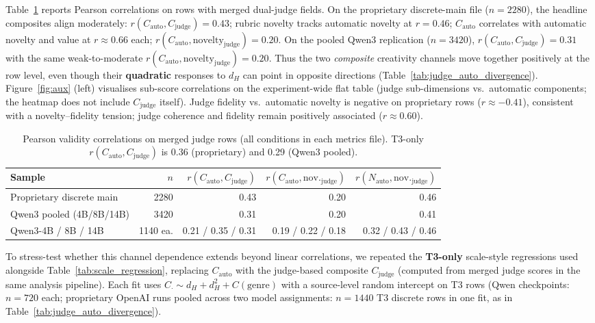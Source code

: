 \documentclass[sigconf,nonacm]{acmart}
\begin{document}
Table~\ref{tab:validity_corr} reports Pearson correlations on rows with merged dual-judge fields.
On the proprietary discrete-main file ($n{=}2280$), the headline composites align moderately: $r(C_{\mathrm{auto}},C_{\mathrm{judge}}){=}0.43$; rubric novelty tracks automatic novelty at $r{=}0.46$; $C_{\mathrm{auto}}$ correlates with automatic novelty and value at $r{\approx}0.66$ each; $r(C_{\mathrm{auto}},\mathrm{novelty}_{\mathrm{judge}}){=}0.20$.
On the pooled Qwen3 replication ($n{=}3420$), $r(C_{\mathrm{auto}},C_{\mathrm{judge}}){=}0.31$ with the same weak-to-moderate $r(C_{\mathrm{auto}},\mathrm{novelty}_{\mathrm{judge}}){=}0.20$.
Thus the two \emph{composite} creativity channels move together positively at the row level, even though their \textbf{quadratic} responses to $d_H$ can point in opposite directions (Table~\ref{tab:judge_auto_divergence}).
Figure~\ref{fig:aux} (left) visualises sub-score correlations on the experiment-wide flat table (judge sub-dimensions vs.\ automatic components; the heatmap does not include $C_{\mathrm{judge}}$ itself).
Judge fidelity vs.\ automatic novelty is negative on proprietary rows ($r{\approx}{-}0.41$), consistent with a novelty--fidelity tension; judge coherence and fidelity remain positively associated ($r{\approx}0.60$).

\begin{table}[t]
\centering
\small
\begin{tabular}{lrrrr}
\toprule
Sample & $n$ & $r(C_{\mathrm{auto}},C_{\mathrm{judge}})$ & $r(C_{\mathrm{auto}},\mathrm{nov.}_{\mathrm{judge}})$ & $r(N_{\mathrm{auto}},\mathrm{nov.}_{\mathrm{judge}})$ \\
\midrule
Proprietary discrete main & 2280 & 0.43 & 0.20 & 0.46 \\
Qwen3 pooled (4B/8B/14B) & 3420 & 0.31 & 0.20 & 0.41 \\
Qwen3-4B / 8B / 14B & 1140 ea. & 0.21 / 0.35 / 0.31 & 0.19 / 0.22 / 0.18 & 0.32 / 0.43 / 0.46 \\
\bottomrule
\end{tabular}
\caption{Pearson validity correlations on merged judge rows (all conditions in each metrics file). T3-only $r(C_{\mathrm{auto}},C_{\mathrm{judge}})$ is 0.36 (proprietary) and 0.29 (Qwen3 pooled).}
\label{tab:validity_corr}
\end{table}

To stress-test whether this channel dependence extends beyond linear correlations, we repeated the \textbf{T3-only} scale-style regressions used alongside Table~\ref{tab:scale_regression}, replacing $C_{\mathrm{auto}}$ with the judge-based composite $C_{\mathrm{judge}}$ (computed from merged judge scores in the same analysis pipeline).
Each fit uses $C_{\cdot} \sim d_H + d_H^2 + C(\mathrm{genre})$ with a source-level random intercept on T3 rows (Qwen checkpoints: $n{=}720$ each; proprietary OpenAI runs pooled across two model assignments: $n{=}1440$ T3 discrete rows in one fit, as in Table~\ref{tab:judge_auto_divergence}).
\end{document}

